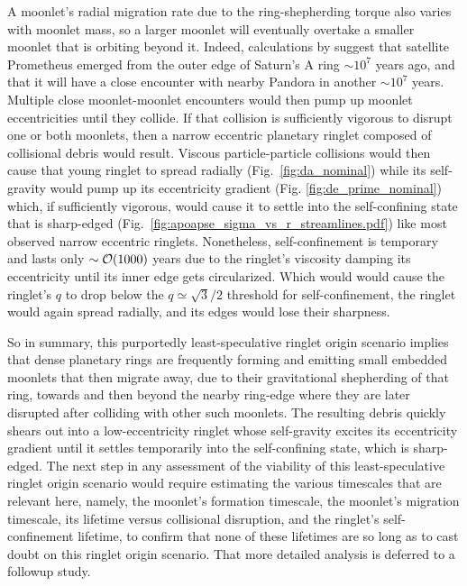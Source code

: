 \documentclass[preprint]{aastex62}
\begin{document}
A moonlet's radial migration rate due to the ring-shepherding torque also
varies with moonlet mass, so a larger moonlet will eventually overtake a smaller moonlet that is orbiting beyond it.
Indeed, calculations by \cite{PS01} suggest that satellite Prometheus emerged from the outer edge of Saturn's A
ring $\sim10^7$ years ago, and that it will have a close encounter with nearby Pandora in another $\sim10^7$ years.
Multiple close moonlet-moonlet encounters would then pump up moonlet eccentricities until they collide. If that collision
is sufficiently vigorous to disrupt one or both moonlets, then a narrow eccentric planetary ringlet composed of
collisional debris would result. Viscous particle-particle
collisions would then cause that young ringlet to spread radially (Fig.\ \ref{fig:da_nominal}) 
while its self-gravity would pump up its eccentricity gradient (Fig. \ref{fig:de_prime_nominal})
which, if sufficiently vigorous, would cause it to settle into the self-confining state that is
sharp-edged (Fig.\ \ref{fig:apoapse_sigma_vs_r_streamlines.pdf}) like most observed narrow eccentric ringlets. 
Nonetheless, self-confinement is temporary
and lasts only $\sim{\cal O}(1000)$ years due to the ringlet's viscosity damping its eccentricity until its inner edge gets circularized. Which would would cause the ringlet's $q$ to drop below the $q\simeq\sqrt{3}/2$ threshold
for self-confinement, the ringlet would again spread radially, and its edges would lose their sharpness.

So in summary, this purportedly least-speculative ringlet origin scenario
implies that dense planetary rings are frequently forming and emitting small embedded moonlets that then migrate away, 
due to their gravitational shepherding of that ring, towards and then beyond the nearby ring-edge
where they are later disrupted after colliding with other such moonlets. The resulting debris quickly
shears out into a low-eccentricity ringlet whose self-gravity excites its eccentricity gradient
until it settles temporarily into the self-confining state, which is sharp-edged. 
The next step in any assessment of the viability
of this least-speculative ringlet origin scenario would require estimating the various timescales that are relevant here,
namely, the moonlet's formation timescale, the moonlet's migration timescale, its lifetime versus collisional
disruption, and the ringlet's self-confinement lifetime, to confirm that none of these lifetimes are so
long as to cast doubt on this ringlet origin scenario. That more detailed analysis is deferred to a followup
study.
\end{document}
